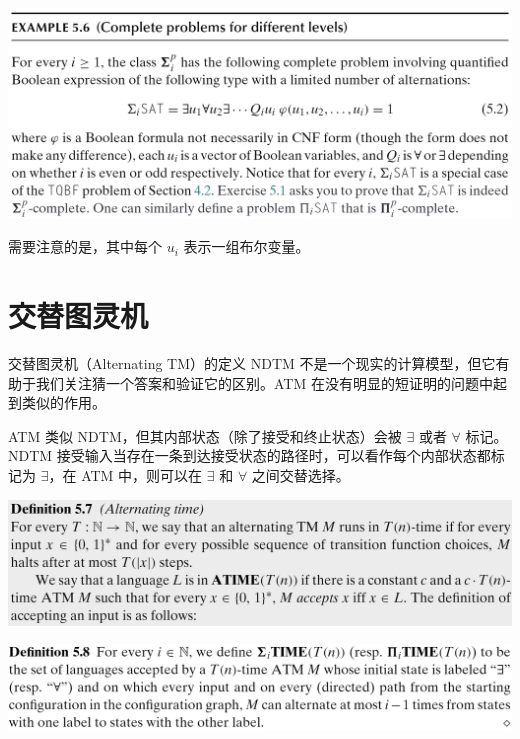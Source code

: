 \documentclass[UTF8,aspectratio=169,mathserif]{beamer}
\begin{document}
	\begin{frame}
		\includegraphics[width=\linewidth]{../../5 & 6/note.assets/image-20210427093527360.png}\newline
		
		需要注意的是，其中每个 $u_i$ 表示一组布尔变量。
	\end{frame}
	
	\section{交替图灵机}
	\begin{frame}{交替图灵机（Alternating TM）的定义}
		NDTM 不是一个现实的计算模型，但它有助于我们关注猜一个答案和验证它的区别。ATM 在没有明显的短证明的问题中起到类似的作用。\newline
		
		ATM 类似 NDTM，但其内部状态（除了接受和终止状态）会被 $\exists$ 或者 $\forall$ 标记。NDTM 接受输入当存在一条到达接受状态的路径时，可以看作每个内部状态都标记为 $\exists$，在 ATM 中，则可以在 $\exists$ 和 $\forall$ 之间交替选择。
	\end{frame}
	\begin{frame}
		\includegraphics[width=\linewidth]{../../5 & 6/note.assets/image-20210427213236953.png}\newline
		
		\includegraphics[width=\linewidth]{../../5 & 6/note.assets/image-20210427094554653.png}
	\end{frame}
	
\end{document}
